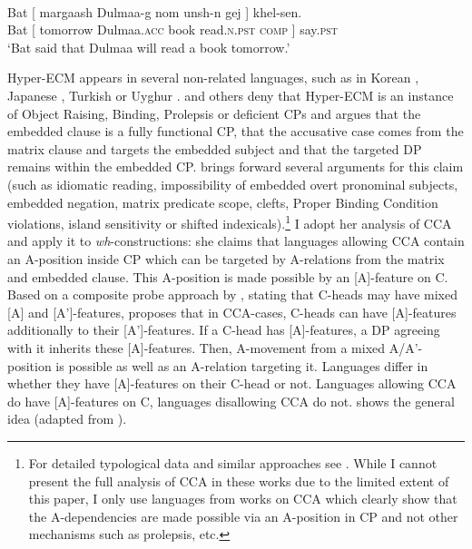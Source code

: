 \documentclass[output=paper,colorlinks,citecolor=brown]{langscibook}
\begin{document}
 \citep[2]{fong2019proper}\\
\gll Bat [ margaash Dulmaa-g nom unsh-n gej ] khel-sen.\\
Bat [ tomorrow Dulmaa.\textsc{acc} book read.\textsc{n.pst} \textsc{comp} ] say.\textsc{pst}\\
\glt `Bat said that Dulmaa will read a book tomorrow.'
\z

\noindent Hyper-ECM appears in several non-related languages, such as in Korean \citep{yoon2007raising}, Japanese \citep{horn2008syntax}, Turkish \citep{csener2011null} or Uyghur \citep{SandS2014}. \citet{wurmbrand2018cross} and others deny that Hy\-per-ECM is an instance of Object Raising, Binding, Prolepsis or deficient CPs and argues that the embedded clause is a fully functional CP, that the accusative case comes from the matrix clause and targets the embedded subject and that the targeted DP remains within the embedded CP.  brings forward several arguments for this claim (such as idiomatic reading, impossibility of embedded overt pronominal subjects, embedded negation, matrix predicate scope, clefts, Proper Binding Condition violations, island sensitivity or shifted indexicals).\footnote{For detailed typological data and similar approaches see \citet{bondarenko2017ecm, bruening2001syntax, deal2017covert, halpert2015argument, halpert2015right, podobryaev2014persons, polinsky2001long, SandS2014, csener2011null, zyman2017p}. While I cannot present the full analysis of CCA in these works due to the limited extent of this paper, I only use languages from works on CCA which clearly show that the A-dependencies are made possible via an A-position in CP and not other mechanisms such as prolepsis, etc.} I adopt her analysis of CCA and apply it to \textit{wh}-constructions: she claims that languages allowing CCA contain an A-position inside CP which can be targeted by A-relations from the matrix and embedded clause. This A-position is made possible by an [A]-feature on C. Based on a composite probe approach by \citet{vanUrk2015}, stating that C-heads may have mixed [A] and [A’]-features, \citet{wurmbrand2018cross} proposes that in CCA-cases, C-heads can have [A]-features additionally to their [A’]-features. If a C-head has [A]-features, a DP agreeing with it inherits these [A]-features. Then, A-movement from a mixed A/A’-position is possible as well as an A-relation targeting it. Languages differ in whether they have [A]-features on their C-head or not. Languages allowing CCA do have [A]-features on C, languages disallowing CCA do not.  shows the general idea (adapted from \citealp[15]{wurmbrand2018cross}).\largerpage
\end{document}
